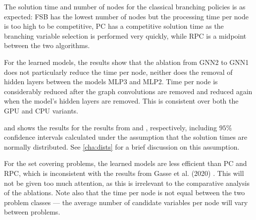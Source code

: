 The solution time and number of nodes for the classical branching policies is as expected: \gls{FSB} has the lowest number of nodes but the processing time per node is too high to be competitive, \gls{PC} has a competitive solution time as the branching variable selection is performed very quickly, while \gls{RPC} is a midpoint between the two algorithms. 

For the learned models, the results show that the ablation from GNN2 to GNN1 does not particularly reduce the time per node, neither does the removal of hidden layers between the models MLP3 and MLP2. Time per node is considerably reduced after the graph convolutions are removed and reduced again when the model's hidden layers are removed. This is consistent over both the \gls{GPU} and \gls{CPU} variants.  



 and  shows the results for the results from  and , respectively, including $95 \%$ confidence intervals calculated under the assumption that the solution times are normally distributed. See \cref{cha:dists} for a brief discussion on this assumption.

For the set covering problems, the learned models are less efficient than \gls{PC} and \gls{RPC}, which is inconsistent with the results from Gasse et al. (2020) \cite{gasse2019exact}. This will not be given too much attention, as this is irrelevant to the comparative analysis of the ablations.
Note also that the time per node is not equal between the two problem classes --- the average number of candidate variables per node will vary between problems.  


